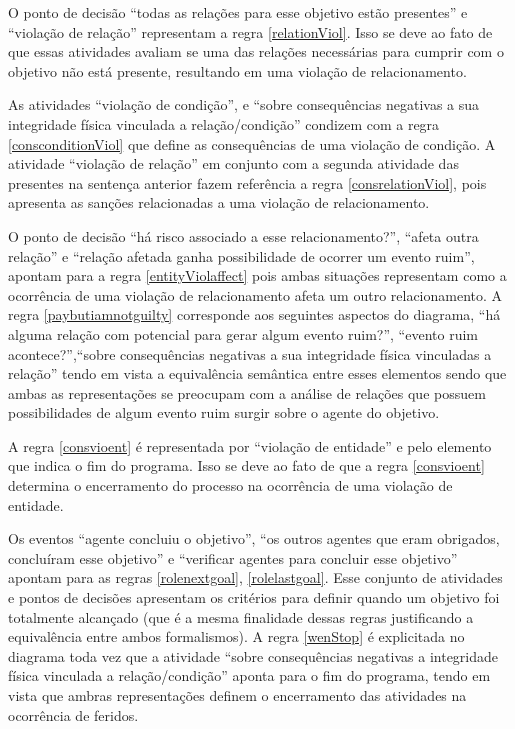 O ponto de decisão ``todas as relações para esse objetivo estão presentes'' e ``violação de relação'' representam a regra \ref{relationViol}. Isso se deve ao fato de que essas atividades avaliam se uma das relações necessárias para cumprir com o objetivo não está presente, resultando em uma violação de relacionamento. 

As atividades ``violação de condição'', e ``sobre consequências negativas a sua integridade física vinculada a relação/condição'' condizem com a regra \ref{consconditionViol} que define as consequências de uma violação de condição. A atividade ``violação de relação'' em conjunto com a segunda atividade das presentes na sentença anterior fazem referência a regra \ref{consrelationViol}, pois apresenta as sanções relacionadas a uma violação de relacionamento. 

O ponto de decisão ``há risco associado a esse relacionamento?'', ``afeta  outra relação'' e ``relação afetada ganha possibilidade de ocorrer um evento ruim'', apontam para a regra \ref{entityViolaffect} pois ambas situações representam como a ocorrência de uma violação de relacionamento afeta um outro relacionamento. A regra \ref{paybutiamnotguilty} corresponde aos seguintes aspectos do diagrama, ``há alguma relação com potencial para gerar algum evento ruim?'', ``evento ruim acontece?'',``sobre consequências negativas a sua integridade física vinculadas a relação'' tendo em vista a equivalência semântica entre esses elementos sendo que ambas as representações se preocupam com a análise de relações que possuem possibilidades de algum evento ruim surgir sobre o agente do objetivo. 

A regra \ref{consvioent} é representada por ``violação de entidade'' e pelo elemento que indica o fim do programa. Isso se deve ao fato de que a regra \ref{consvioent} determina o encerramento do processo na ocorrência de uma violação de entidade. 

Os eventos ``agente concluiu o objetivo'', ``os outros agentes que eram obrigados, concluíram esse objetivo'' e ``verificar agentes para concluir esse objetivo'' apontam para as regras \ref{rolenextgoal}, \ref{rolelastgoal}. Esse conjunto de atividades e pontos de decisões apresentam os critérios para definir quando um objetivo foi totalmente alcançado (que é a mesma finalidade dessas regras justificando a equivalência entre ambos formalismos).  A regra \ref{wenStop} é explicitada no diagrama toda vez que a atividade ``sobre consequências negativas a integridade física vinculada  a relação/condição'' aponta para o fim do programa, tendo em vista que ambras representações definem o encerramento das atividades na ocorrência de feridos. 

